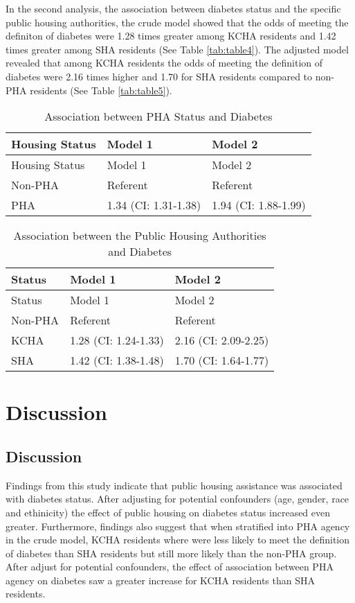 \documentclass [11pt, proquest] {uwthesis}[2015/03/03]
\begin{document}
In the second analysis, the association between diabetes status and the
specific public housing authorities, the crude model showed that the
odds of meeting the definiton of diabetes were 1.28 times greater among
KCHA residents and 1.42 times greater among SHA residents (See Table
\ref{tab:table4}). The adjusted model revealed that among KCHA residents
the odds of meeting the definition of diabetes were 2.16 times higher
and 1.70 for SHA residents compared to non-PHA residents (See Table
\ref{tab:table5}).
\begin{longtable}[]{@{}lll@{}}
\caption{\label{tab:PHA} Association between PHA Status and
Diabetes}\tabularnewline
\toprule
Housing Status & Model 1 & Model 2\tabularnewline
\midrule
\endfirsthead
\toprule
Housing Status & Model 1 & Model 2\tabularnewline
\midrule
\endhead
Non-PHA & Referent & Referent\tabularnewline
PHA & 1.34 (CI: 1.31-1.38) & 1.94 (CI: 1.88-1.99)\tabularnewline
\bottomrule
\end{longtable}
\begin{longtable}[]{@{}lll@{}}
\caption{\label{tab:PHAA} Association between the Public Housing Authorities
and Diabetes}\tabularnewline
\toprule
Status & Model 1 & Model 2\tabularnewline
\midrule
\endfirsthead
\toprule
Status & Model 1 & Model 2\tabularnewline
\midrule
\endhead
Non-PHA & Referent & Referent\tabularnewline
KCHA & 1.28 (CI: 1.24-1.33) & 2.16 (CI: 2.09-2.25)\tabularnewline
SHA & 1.42 (CI: 1.38-1.48) & 1.70 (CI: 1.64-1.77)\tabularnewline
\bottomrule
\end{longtable}
\chapter{Discussion}\label{discussion}

\section{Discussion}\label{discussion-1}

Findings from this study indicate that public housing assistance was
associated with diabetes status. After adjusting for potential
confounders (age, gender, race and ethinicity) the effect of public
housing on diabetes status increased even greater. Furthermore, findings
also suggest that when stratified into PHA agency in the crude model,
KCHA residents where were less likely to meet the definition of diabetes
than SHA residents but still more likely than the non-PHA group. After
adjust for potential confounders, the effect of association between PHA
agency on diabetes saw a greater increase for KCHA residents than SHA
residents.
\end{document}

